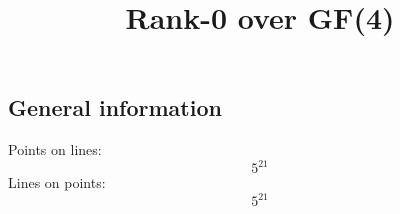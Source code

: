 \documentclass{article}
\newcommand\setTBstruts{\def\T{\rule{0pt}{2.6ex}}%
\def\B{\rule[-1.2ex]{0pt}{0pt}}}
\begin{document}
 
\setTBstruts



{\allowdisplaybreaks%






\title{Rank-0 over GF(4)}
\author{}%
\maketitle%
%
{}



\subsection*{General information}
Points on lines:
$$
5^{21}$$
Lines on points:
$$
5^{21}$$
}
\end{document}
